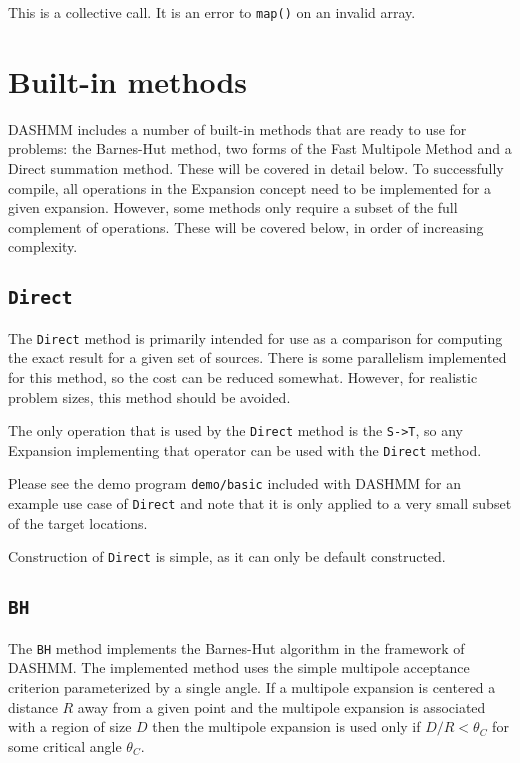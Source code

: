 \documentclass[11pt]{book}
\begin{document}
This is a collective call. It is an error to {\tt map()} on an invalid array.

\section{Built-in methods}

DASHMM includes a number of built-in methods that are ready to use for
problems: the Barnes-Hut method, two forms of the Fast Multipole Method and
a Direct summation method. These will be covered in detail below. To
successfully compile, all operations in the Expansion concept need to be
implemented for a given expansion. However, some methods only require a
subset of the full complement of operations. These will be covered below,
in order of increasing complexity.

\subsection{{\tt Direct}}

The {\tt Direct} method is primarily intended for use as a comparison for
computing 
the exact result for a given set of sources. There is some parallelism
implemented for this method, so the cost can be reduced somewhat. However, for
realistic problem sizes, this method should be avoided.

The only operation that is used by the {\tt Direct} method is the 
{\tt S->T}, 
so any Expansion implementing that operator can be used with the {\tt Direct}
method.


Please see the demo program {\tt demo/basic} included with DASHMM for an example
use case of {\tt Direct} and note that it is only applied to a very small subset
of the target locations.

Construction of {\tt Direct} is simple, as it can only be default constructed.

\subsection{{\tt BH}}

The {\tt BH} method implements the Barnes-Hut algorithm in the framework of
DASHMM. The implemented method uses the simple multipole acceptance criterion
parameterized by a single angle. If a multipole expansion is centered a
distance $R$ away from a given point and the multipole expansion is
associated with a region of size $D$ then the multipole expansion is used
only if $D/R < \theta_C$ for some critical angle $\theta_C$.
\end{document}
